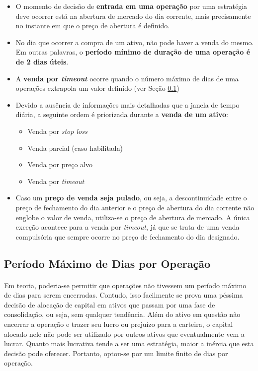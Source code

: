 \begin{itemize}
    \item O momento de decisão de \textbf{entrada em uma operação} por uma estratégia deve ocorrer está na abertura de mercado do dia corrente, mais precisamente no instante em que o preço de abertura é definido.

    \item No dia que ocorrer a compra de um ativo, não pode haver a venda do mesmo. Em outras palavras, o \textbf{período mínimo de duração de uma operação é de 2 dias úteis}.

    \item A \textbf{venda por \textit{timeout}} ocorre quando o número máximo de dias de uma operações extrapola um valor definido (ver Seção \ref{subsection:max_op_days})

    \item Devido a ausência de informações mais detalhadas que a janela de tempo diária, a seguinte ordem é priorizada durante a \textbf{venda de um ativo}:

    \begin{itemize}
        \item Venda por \textit{stop loss}
        \item Venda parcial (caso habilitada)
        \item Venda por preço alvo
        \item Venda por \textit{timeout}
    \end{itemize}

    \item Caso um \textbf{preço de venda seja pulado}, ou seja, a descontinuidade entre o preço de fechamento do dia anterior e o preço de abertura do dia corrente não englobe o valor de venda, utiliza-se o preço de abertura de mercado. A única exceção acontece para a venda por \textit{timeout}, já que se trata de uma venda compulsória que sempre ocorre no preço de fechamento do dia designado.

\end{itemize}



\subsection{Período Máximo de Dias por Operação}
\label{subsection:max_op_days}

\paragraph{} Em teoria, poderia-se permitir que operações não tivessem um período máximo de dias para serem encerradas. Contudo, isso facilmente se prova uma péssima decisão de alocação de capital em ativos que passam por uma fase de consolidação, ou seja, sem qualquer tendência. Além do ativo em questão não encerrar a operação e trazer seu lucro ou prejuízo para a carteira, o capital alocado nele não pode ser utilizado por outros ativos que eventualmente vem a lucrar. Quanto mais lucrativa tende a ser uma estratégia, maior a inércia que esta decisão pode oferecer. Portanto, optou-se por um limite finito de dias por operação.

